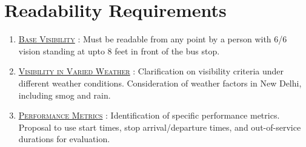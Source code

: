 \section{Readability Requirements}

\begin{enumerate}
    \item {}\underline{\textsc{Base Visibility}} : Must be readable from any point by a person with \gls{6/6 vision} standing at upto 8 feet in front of the bus stop.

    \item \underline{\textsc{Visibility in Varied Weather}} : Clarification on visibility criteria under different weather conditions. Consideration of weather factors in New Delhi, including \gls{smog} and rain.

    \item \underline{\textsc{Performance Metrics}} : Identification of specific performance metrics. Proposal to use start times, stop arrival/departure times, and out-of-service durations for evaluation.

\end{enumerate}